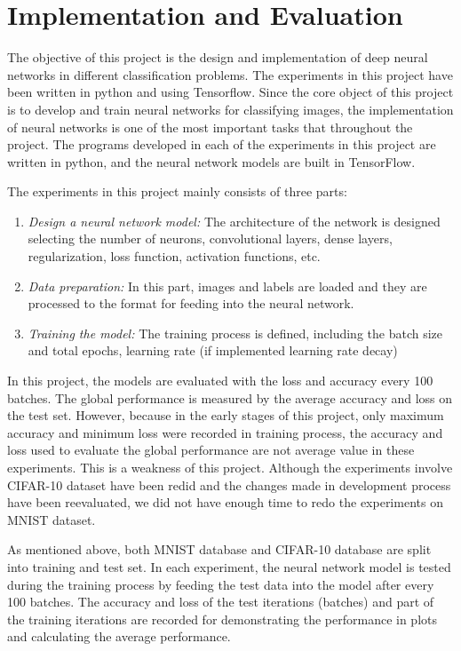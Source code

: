\documentclass[]{UCD_CS_FYP_Report}
\begin{document}
\chapter{\label{chapter5}Implementation and Evaluation}
The objective of this project is the design and implementation of deep neural networks in different classification problems. The experiments in this project have been written in python and using Tensorflow.
Since the core object of this project is to develop and train neural networks for classifying images, the implementation of neural networks is one of the most important tasks that throughout the project. The programs developed in each of the experiments in this project are written in python, and the neural network models are built in TensorFlow. 

The experiments in this project mainly consists of three parts: 
\begin{enumerate}
\item {\sl Design a neural network model:} The architecture of the network is designed selecting the number of neurons, convolutional layers, dense layers, regularization, loss function, activation functions, etc. 
\item {\sl Data preparation:} In this part, images and labels are loaded and they are processed to the format for feeding into the neural network.
\item {\sl Training the model:} The training process is defined, including the batch size and total epochs, learning rate (if implemented learning rate decay)
\end{enumerate}

In this project, the models are evaluated with the loss and accuracy every 100 batches. The global  performance is measured by the average accuracy and loss on the test set. However, because in the early stages of this project, only maximum accuracy and minimum loss were recorded in training process, the accuracy and loss used to evaluate the global performance are not average value in these experiments. This is a weakness of this project. Although the experiments involve CIFAR-10 dataset have been redid and the changes made in development process have been reevaluated, we did not have enough time to redo the experiments on MNIST dataset.

As mentioned above, both MNIST database and CIFAR-10 database are split into training and test set. In each experiment, the neural network model is tested during the training process by feeding the test data into the model after every 100 batches. The accuracy and loss of the test iterations (batches) and part of the training iterations are recorded for demonstrating the performance in plots and calculating the average performance.
\end{document}
